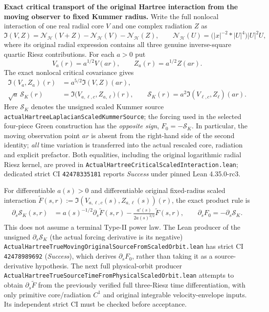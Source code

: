 \documentclass[11pt]{amsart}
\newcommand{\HH}{\mathcal H}
\begin{document}
\medskip
\noindent\textbf{Exact critical transport of the original Hartree
interaction from the moving observer to fixed Kummer radius.}
Write the full nonlocal interaction of one real radial core \(V\)
and one complex radiation \(Z\) as
\[
 {\mathfrak I}(V,Z)
 =\mathcal N_{\HH}(V+Z)-\mathcal N_{\HH}(V)
   -\mathcal N_{\HH}(Z),\qquad
 \mathcal N_{\HH}(U)=\bigl(|x|^{-2}*|U|^4\bigr)|U|^2U,
\]
where its original radial expression contains all three genuine
inverse-square quartic Riesz contributions. For each \(a>0\)
put
\[
 V_a(r)=a^{1/2}V(ar),\qquad Z_a(r)=a^{1/2}Z(ar).
\]
The exact nonlocal critical covariance gives
\begin{align}
 {\mathfrak I}(V_a,Z_a)(r)
 &=a^{5/2}{\mathfrak I}(V,Z)(ar),\label{eq:hbl-critical-full-mixed-scaling}\\
 \sqrt a\,\mathcal S_K(r)
 &={\mathfrak I}\bigl(V_{a,\ell,c},Z_{a,\ell}\bigr)(r),
 \qquad
 \mathcal S_K(r)=a^2 {\mathfrak I}(V_{\ell,c},Z_\ell)(ar).
 \label{eq:hbl-critical-original-source-fixed-radius}
\end{align}
Here \(\mathcal S_K\) denotes the unsigned scaled Kummer source
\texttt{actualHartreeLaplacianScaledKummerSource}; the forcing
used in the selected four-piece Green construction has the
\emph{opposite sign}, \(F_0=-\mathcal S_K\).
In particular, the moving observation point \(ar\) is absent
from the right-hand side of the second identity; \emph{all}
time variation is transferred into the actual rescaled core,
radiation and explicit prefactor. Both equalities, including the
original logarithmic radial Riesz kernel, are proved in
\texttt{ActualHartreeCriticalScaledInteraction.lean};
dedicated strict CI \texttt{42478335181} reports
\emph{Success} under pinned Lean 4.35.0-rc3.

For differentiable \(a(s)>0\) and differentiable original
fixed-radius scaled interaction
\(\widetilde F(s,r):={\mathfrak I}(V_{a,\ell,c}(s),
Z_{a,\ell}(s))(r)\), the exact product rule is
\begin{align}
 \partial_s\mathcal S_K(s,r)
  &=a(s)^{-1/2}\partial_s\widetilde F(s,r)
     -\frac{a'(s)}{2a(s)^{3/2}}\widetilde F(s,r),\qquad
 \partial_sF_0=-\partial_s\mathcal S_K.
 \label{eq:hbl-original-hartree-source-time-via-critical}
\end{align}
This does not assume a terminal Type-II power law.
The Lean producer of the unsigned \(\partial_s\mathcal S_K\)
(the actual forcing derivative is its negative)
\texttt{ActualHartreeTrueMovingOriginalSourceFromScaledOrbit.lean}
has strict CI \texttt{42478989692} (\emph{Success}),
which derives \(\partial_sF_0\), rather than taking it as
a source-derivative hypothesis. The next full physical-orbit
producer \texttt{ActualHartreeTrueSourceTimeFromPhysicalScaledOrbit.lean}
attempts to obtain \(\partial_s\widetilde F\) from the previously
verified full three-Riesz time differentiation, with only primitive
core/radiation \(C^1\) and original integrable velocity-envelope
inputs. Its independent strict CI must be checked before acceptance.
\end{document}

